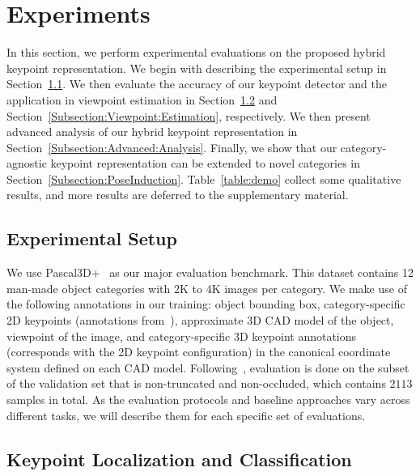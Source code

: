 \documentclass[runningheads]{llncs}
\begin{document}
 \section{Experiments}

In this section, we perform experimental evaluations on the proposed hybrid keypoint representation. We begin with describing the experimental setup in Section~\ref{Subsection:Experimental:Setup}. We then evaluate the accuracy of our keypoint detector and the application in viewpoint estimation in Section~\ref{Subsection:Keypoint:Detection:Classification} and Section~\ref{Subsection:Viewpoint:Estimation}, respectively. We then present advanced analysis of our hybrid keypoint representation in Section~\ref{Subsection:Advanced:Analysis}. 
Finally, we show that our category-agnostic keypoint representation can be extended to novel categories in Section~\ref{Subsection:PoseInduction}.
Table~\ref{table:demo} collect some qualitative results, and more results are deferred to the supplementary material.

\subsection{Experimental Setup}
\label{Subsection:Experimental:Setup}

We use Pascal3D+~\cite{xiang2014beyond} as our major evaluation benchmark.  This dataset contains 12 man-made object categories with 2K to 4K images per category. We make use of the following annotations in our training:
object bounding box, category-specific 2D keypoints (annotations from~\cite{bourdev2010detecting}), approximate 3D CAD model of the object, viewpoint of the image, and category-specific 3D keypoint annotations (corresponds with the 2D keypoint configuration) in the canonical coordinate system defined on each CAD model.
Following~\cite{tulsiani2015viewpoints,su2015render}, evaluation is done on the subset of the validation set that is non-truncated and non-occluded, which contains $2113$ samples in total. 
As the evaluation protocols and baseline approaches vary across different tasks, we will describe them for each specific set of evaluations.

\subsection{Keypoint Localization and Classification}
\label{Subsection:Keypoint:Detection:Classification}
\end{document}
